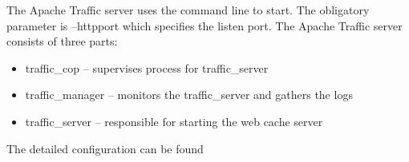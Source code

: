 The Apache Traffic server uses the command line to start. The obligatory parameter is --httpport which specifies the listen port. The Apache Traffic server consists of three parts:

\begin{itemize}
	\item traffic\_cop -- supervises process for traffic\_server 
	\item traffic\_manager -- monitors the traffic\_server and gathers the logs
	\item traffic\_server -- responsible for starting the web cache server
\end{itemize}

The detailed configuration can be found \cite{ats_site}

\newpage